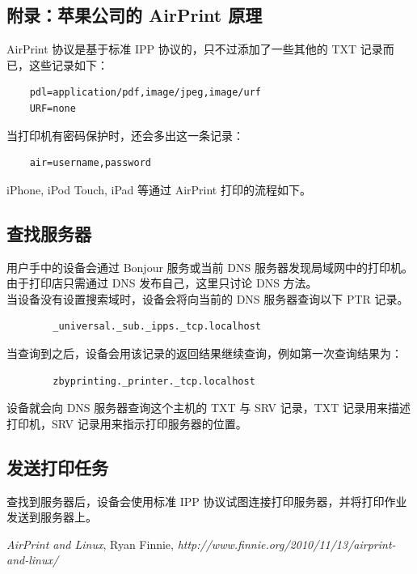 \documentclass{article}
\begin{document}
\begin{CJK}{UTF8}{gbsn}
\section{附录：苹果公司的 AirPrint 原理}
	AirPrint 协议是基于标准 IPP 协议的\cite{airprint}，只不过添加了一些其他的 TXT 记录而已，这些记录如下：
	\begin{verbatim}
	pdl=application/pdf,image/jpeg,image/urf
	URF=none
	\end{verbatim}
	当打印机有密码保护时，还会多出这一条记录：
	\begin{verbatim}
	air=username,password
	\end{verbatim}
	iPhone, iPod Touch, iPad 等通过 AirPrint 打印的流程如下。
	\subsection{查找服务器}
		用户手中的设备会通过 Bonjour 服务或当前 DNS 服务器发现局域网中的打印机。由于打印店只需通过 DNS 发布自己，这里只讨论 DNS 方法。\\
		当设备没有设置搜索域时，设备会将向当前的 DNS 服务器查询以下 PTR 记录。
		\begin{verbatim}
		_universal._sub._ipps._tcp.localhost
		\end{verbatim}
		当查询到之后，设备会用该记录的返回结果继续查询，例如第一次查询结果为：
		\begin{verbatim}
		zbyprinting._printer._tcp.localhost
		\end{verbatim}
		设备就会向 DNS 服务器查询这个主机的 TXT 与 SRV 记录，TXT 记录用来描述打印机，SRV 记录用来指示打印服务器的位置。
	\subsection{发送打印任务}
		查找到服务器后，设备会使用标准 IPP 协议试图连接打印服务器，并将打印作业发送到服务器上。
\newpage
{}
\renewcommand\refname{\hfil 参~考~文~献}
\begin{thebibliography}{1}
	\textsl{AirPrint and Linux}, Ryan Finnie, \textsl{http://www.finnie.org/2010/11/13/airprint-and-linux/}
\end{thebibliography}

\newpage
\end{CJK}
\end{document}
